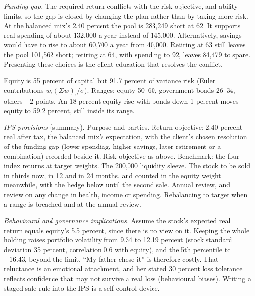 \begin{qfexample}
\emph{Funding gap.} The required return conflicts with the risk objective, and ability limits, so the gap is closed by changing the plan rather than by taking more risk. At the balanced mix's 2.40 percent the pool is 283{,}249 short at 62. It supports real spending of about 132{,}000 a year instead of 145{,}000. Alternatively, savings would have to rise to about 60{,}700 a year from 40{,}000. Retiring at 63 still leaves the pool 101{,}562 short; retiring at 64, with spending to 92, leaves 84{,}479 to spare. Presenting these choices is the client education that resolves the conflict.

Equity is 55 percent of capital but 91.7 percent of variance risk (Euler contributions $w_i(\Sigma w)_i/\sigma$). Ranges: equity 50--60, government bonds 26--34, others $\pm2$ points. An 18 percent equity rise with bonds down 1 percent moves equity to 59.2 percent, still inside its range.

\emph{IPS provisions} (summary). Purpose and parties. Return objective: 2.40 percent real after tax, the balanced mix's expectation, with the client's chosen resolution of the funding gap (lower spending, higher savings, later retirement or a combination) recorded beside it. Risk objective as above. Benchmark: the four index returns at target weights. The 200{,}000 liquidity sleeve. The stock to be sold in thirds now, in 12 and in 24 months, and counted in the equity weight meanwhile, with the hedge below until the second sale. Annual review, and review on any change in health, income or spending. Rebalancing to target when a range is breached and at the annual review.

\emph{Behavioural and governance implications.} Assume the stock's expected real return equals equity's 5.5 percent, since there is no view on it. Keeping the whole holding raises portfolio volatility from 9.34 to 12.19 percent (stock standard deviation 35 percent, correlation 0.6 with equity), and the 5th percentile to $-16.43$, beyond the limit. ``My father chose it'' is therefore costly. That reluctance is an emotional attachment, and her stated 30 percent loss tolerance reflects confidence that may not survive a real loss (\hyperref[def:behavioural-biases]{behavioural biases}). Writing a staged-sale rule into the IPS is a self-control device.


\end{qfexample}

